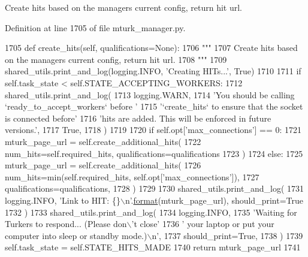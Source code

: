 \begin{DoxyVerb}Create hits based on the managers current config, return hit url.
\end{DoxyVerb}
 

Definition at line 1705 of file mturk\+\_\+manager.\+py.


\begin{DoxyCode}
1705     \textcolor{keyword}{def }create\_hits(self, qualifications=None):
1706         \textcolor{stringliteral}{"""}
1707 \textcolor{stringliteral}{        Create hits based on the managers current config, return hit url.}
1708 \textcolor{stringliteral}{        """}
1709         shared\_utils.print\_and\_log(logging.INFO, \textcolor{stringliteral}{'Creating HITs...'}, \textcolor{keyword}{True})
1710 
1711         \textcolor{keywordflow}{if} self.task\_state < self.STATE\_ACCEPTING\_WORKERS:
1712             shared\_utils.print\_and\_log(
1713                 logging.WARN,
1714                 \textcolor{stringliteral}{'You should be calling `ready\_to\_accept\_workers` before '}
1715                 \textcolor{stringliteral}{'`create\_hits` to ensure that the socket is connected before'}
1716                 \textcolor{stringliteral}{'hits are added. This will be enforced in future versions.'},
1717                 \textcolor{keyword}{True},
1718             )
1719 
1720         \textcolor{keywordflow}{if} self.opt[\textcolor{stringliteral}{'max\_connections'}] == 0:
1721             mturk\_page\_url = self.create\_additional\_hits(
1722                 num\_hits=self.required\_hits, qualifications=qualifications
1723             )
1724         \textcolor{keywordflow}{else}:
1725             mturk\_page\_url = self.create\_additional\_hits(
1726                 num\_hits=min(self.required\_hits, self.opt[\textcolor{stringliteral}{'max\_connections'}]),
1727                 qualifications=qualifications,
1728             )
1729 
1730         shared\_utils.print\_and\_log(
1731             logging.INFO, \textcolor{stringliteral}{'Link to HIT: \{\}\(\backslash\)n'}.\hyperlink{namespaceparlai_1_1chat__service_1_1services_1_1messenger_1_1shared__utils_a32e2e2022b824fbaf80c747160b52a76}{format}(mturk\_page\_url), should\_print=\textcolor{keyword}{True}
1732         )
1733         shared\_utils.print\_and\_log(
1734             logging.INFO,
1735             \textcolor{stringliteral}{'Waiting for Turkers to respond... (Please don\(\backslash\)'t close'}
1736             \textcolor{stringliteral}{' your laptop or put your computer into sleep or standby mode.)\(\backslash\)n'},
1737             should\_print=\textcolor{keyword}{True},
1738         )
1739         self.task\_state = self.STATE\_HITS\_MADE
1740         \textcolor{keywordflow}{return} mturk\_page\_url
1741 
\end{DoxyCode}
